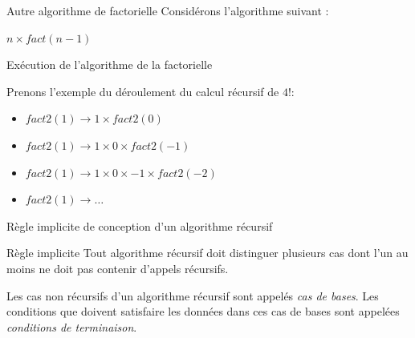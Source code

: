 \documentclass[10pt,xcolor=dvipsnames]{beamer}
\begin{document}
\begin{frame}{Autre algorithme de factorielle}
    Considérons l'algorithme suivant :
    
    \begin{tcolorbox}
  \begin{algorithmic}[1]
        \State{} $n \times fact(n-1)$
    \EndFunction
  \end{algorithmic}
\end{tcolorbox}


\end{frame}

\begin{frame}{Exécution de l'algorithme de la factorielle}

Prenons l'exemple du déroulement du calcul récursif de $4!$:
\begin{center}
    \begin{itemize}[<+->]
\item[] $fact2(1) \rightarrow 1 \times fact2(0)$
\item[] $fact2(1) \rightarrow 1 \times 0 \times fact2(-1)$
\item[] $fact2(1) \rightarrow 1 \times 0 \times -1 \times fact2(-2)$
\item[] $fact2(1) \rightarrow \ldots $
\end{itemize}
\end{center}

\end{frame}


\begin{frame}{Règle implicite de conception d'un algorithme récursif}
    \begin{exampleblock}{Règle implicite}
        Tout algorithme récursif doit distinguer plusieurs cas dont l'un au moins ne doit pas contenir d'appels récursifs.
    \end{exampleblock}
    
    Les cas non récursifs d'un algorithme récursif sont appelés \alert{\textit{cas de bases}}. Les conditions que doivent satisfaire les données dans ces cas de bases sont appelées \alert{\textit{conditions de terminaison}}.
    
\end{frame}
\end{document}
